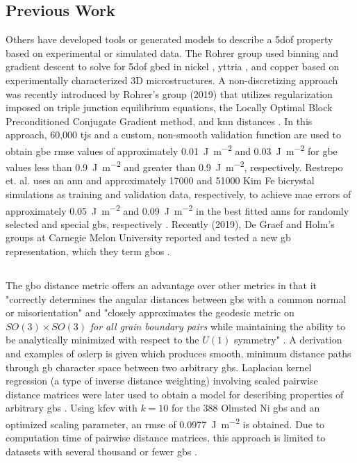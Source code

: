 \documentclass[preprint,12pt]{elsarticle}
\begin{document}
\subsection{Previous Work}
Others have developed tools or generated models to describe a \gls{5dof} property based on experimental or simulated data. The Rohrer group used binning and gradient descent to solve for \gls{5dof} \gls{gbed} in nickel \cite{liRelativeGrainBoundary2009}, yttria \cite{dillonCharacterizationGrainboundaryCharacter2009}, and copper \cite{randleFiveparameterGrainBoundary2008} based on experimentally characterized 3D microstructures. A non-discretizing approach was recently introduced by Rohrer's group (2019) that utilizes regularization imposed on triple junction equilibrium equations, the Locally Optimal Block Preconditioned Conjugate Gradient method, and \gls{knn} distances \cite{shenDeterminingGrainBoundary2019}. In this approach, 60,000 \glspl{tj} and a custom, non-smooth validation function are used to obtain \gls{gbe} \gls{rmse} values of approximately \SI{0.01}{\J\per\square\meter} and \SI{0.03}{\J\per\square\meter} for \gls{gbe} values less than \SI{0.9}{\J\per\square\meter} and greater than \SI{0.9}{\J\per\square\meter}, respectively. Restrepo et. al. uses an \gls{ann} and approximately \num{17000} and \num{51000} Kim Fe bicrystal simulations \cite{kimIdentificationSchemeGrain2011} as training and validation data, respectively, to achieve \gls{mae} errors of approximately \SI{0.05}{\J\per\square\meter} and \SI{0.09}{\J\per\square\meter} in the best fitted \glspl{ann} for randomly selected and special \glspl{gb}, respectively \cite{echeverrirestrepoUsingArtificialNeural2014}. Recently (2019), De Graef and Holm's groups at Carnegie Melon University reported and tested a new \gls{gb} representation, which they term \glspl{gbo} \cite{francisGeodesicOctonionMetric2019,chesserLearningGrainBoundary2020}.

\subsection{}
The \gls{gbo} distance metric offers an advantage over other metrics in that it "correctly determines the angular distances between \glspl{gb} with a common normal or misorientation" and "closely approximates the geodesic metric on $SO(3) \times SO(3)$ \textit{for all grain boundary pairs} while maintaining the ability to be analytically minimized with respect to the $U(1)$ symmetry" \cite{francisGeodesicOctonionMetric2019}. A derivation and examples of \gls{oslerp} is given which produces smooth, minimum distance paths through \gls{gb} character space between two arbitrary \glspl{gb}. Laplacian kernel regression (a type of inverse distance weighting) involving scaled pairwise distance matrices were later used to obtain a model for describing properties of arbitrary \glspl{gb} \cite{chesserLearningGrainBoundary2020}. Using \gls{kfcv} with $k=10$ for the 388 Olmsted Ni \glspl{gb} and an optimized scaling parameter, an \gls{rmse} of \SI{0.0977}{\J\per\square\meter} is obtained. Due to computation time of pairwise distance matrices, this approach is limited to datasets with several thousand or fewer \glspl{gb} \cite{chesserLearningGrainBoundary2020}.
\end{document}
